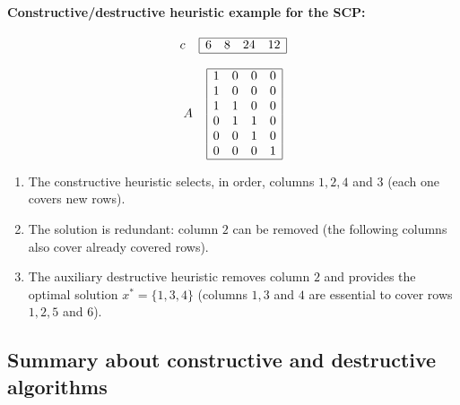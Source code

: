 \newpage

\paragraph{Constructive/destructive heuristic example for the SCP:}
$$
c \;\;\;\; 
\begin{array}{| c c c c |}
	\hline
	6 & 8 & 24 & 12 \\
	\hline
\end{array}
$$

$$
A \;\;\;\;
\begin{array}{| c c c c |}
	\hline 
	1 & 0 & 0 & 0 \\
	1 & 0 & 0 & 0 \\
	1 & 1 & 0 & 0 \\
	0 & 1 & 1 & 0 \\
	0 & 0 & 1 & 0 \\
	0 & 0 & 0 & 1 \\
	\hline 
\end{array}
$$

\begin{enumerate}
	\item The constructive heuristic selects, in order, columns $1, 2, 4$ and $3$ (each one covers new rows).\\
	
	\item The solution is redundant: column $2$ can be removed (the following columns also cover already covered rows).\\
	
	\item The auxiliary destructive heuristic removes column $2$ and provides the optimal solution $x^\ast = \{1, 3, 4\}$ (columns $1, 3$ and $4$ are essential to cover rows $1, 2, 5$ and $6$).\\
\end{enumerate}

\newpage

\subsection*{Summary about constructive and destructive algorithms}

